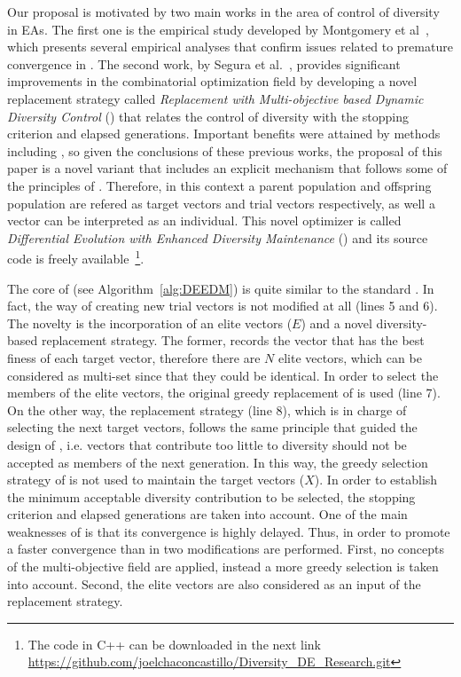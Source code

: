 Our proposal is motivated by two main works in the area of control of diversity in EAs.
%
The first one is the empirical study developed by Montgomery et al~\cite{montgomery2012simple},
which presents several empirical analyses that confirm issues related to premature convergence in \DE{}.
%
The second work, by Segura et al.~\cite{segura2016novel}, provides significant improvements in the combinatorial optimization field
by developing a novel replacement strategy called \textit{Replacement with Multi-objective based Dynamic Diversity Control} (\RMDDC{}) 
that relates the control of diversity with the stopping criterion and elapsed generations.
%
Important benefits were attained by methods including \RMDDC{}, so given the conclusions of these previous works, the proposal of this paper is a 
novel \DE{} variant that includes an explicit mechanism that follows some of the principles of \RMDDC{}.
%
Therefore, in this context a parent population and offspring population are refered as target vectors and trial vectors respectively, as well a vector can be interpreted as an individual.
%
This novel optimizer is called \textit{Differential Evolution with Enhanced Diversity Maintenance} (\DEEDM{}) and its source
code is freely available~\footnote{The code in C++ can be downloaded in the next link \url{https://github.com/joelchaconcastillo/Diversity\_DE\_Research.git}}.

The core of \DEEDM{} (see Algorithm~\ref{alg:DEEDM}) is quite similar to the standard \DE{}.
%
In fact, the way of creating new trial vectors is not modified at all (lines 5 and 6).
%
The novelty is the incorporation of an elite vectors ($E$) and a novel diversity-based replacement strategy.
%
The former, records the vector that has the best finess of each target vector, therefore there are $N$ elite vectors, which can be considered as multi-set since that they could be identical.
%
In order to select the members of the elite vectors, the original greedy replacement of \DE{} is used (line 7).
%
On the other way, the replacement strategy (line 8), which is in charge of selecting the next target vectors,
follows the same principle that guided the 
design of \RMDDC{}, i.e. vectors that contribute too little to diversity should not be accepted as members of the next generation.
%
In this way, the greedy selection strategy of \DE{} is not used to maintain the target vectors ($X$).
%
In order to establish the minimum acceptable diversity contribution to be selected, the stopping criterion and elapsed
generations are taken into account.
%
One of the main weaknesses of \RMDDC{} is that its convergence is highly delayed.
%
Thus, in order to promote a faster convergence than in \RMDDC{} two modifications are performed.
%
First, no concepts of the multi-objective field are applied, instead a more greedy selection is taken into account.
%
Second, the elite vectors are also considered as an input of the replacement strategy.

